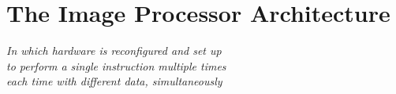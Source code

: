 \chapter{The Image Processor Architecture}\label{ch:fpga}

\begin{flushright}{\slshape
    In which hardware is reconfigured and set up\\
    to perform a single instruction multiple times\\
    each time with different data, simultaneously
}
\end{flushright}





